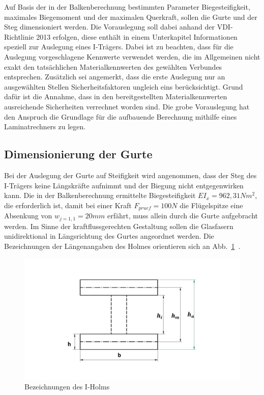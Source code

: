
Auf Basis der in der Balkenberechnung bestimmten Parameter Biegesteifigkeit, maximales Biegemoment und der maximalen Querkraft, sollen die Gurte und der Steg dimensioniert werden. Die Vorauslegung soll dabei anhand der VDI- Richtlinie 2013 erfolgen, diese enthält in einem Unterkapitel Informationen speziell zur Auslegung eines I-Trägers. Dabei ist zu beachten, dass für die Auslegung vorgeschlagene Kennwerte verwendet werden, die im Allgemeinen nicht exakt den tatsächlichen Materialkennwerten des gewählten Verbundes entsprechen. Zusätzlich sei angemerkt, dass die erste Auslegung nur an ausgewählten Stellen Sicherheitsfaktoren ungleich eins berücksichtigt. Grund dafür ist die Annahme, dass in den bereitgestellten Materialkennwerten ausreichende Sicherheiten verrechnet worden sind. Die grobe Vorauslegung hat den Anspruch die Grundlage für die aufbauende Berechnung mithilfe eines Laminatrechners zu legen.

\subsection{Dimensionierung der Gurte}
\label{GurtDim}
Bei der Auslegung der Gurte auf Steifigkeit wird angenommen, dass der Steg des I-Trägers keine Längskräfte aufnimmt und der Biegung nicht entgegenwirken kann. Die in der Balkenberechnung ermittelte Biegesteifigkeit $ EI_{x} = 962,31 Nm^{2} $, die erforderlich ist, damit bei einer Kraft $ F_{pruef}=100N $ die Flügelspitze eine Absenkung von $ w_{j=1,1}=20mm $ erfährt, muss allein durch die Gurte aufgebracht werden. Im Sinne der kraftflussgerechten Gestaltung sollen die Glasfasern unidirektional in Längsrichtung des Gurtes angeordnet werden. Die Bezeichnungen der Längenangaben des Holmes orientieren sich an Abb.~\ref{fig: Rechteckholm}~.\\

\begin{figure}[h]
	\includegraphics[width=1.0\textwidth]{Bilder/RechteckHolm.jpg}
	\caption{Bezeichnungen des I-Holms}
	\label{fig: Rechteckholm}
\end{figure}

